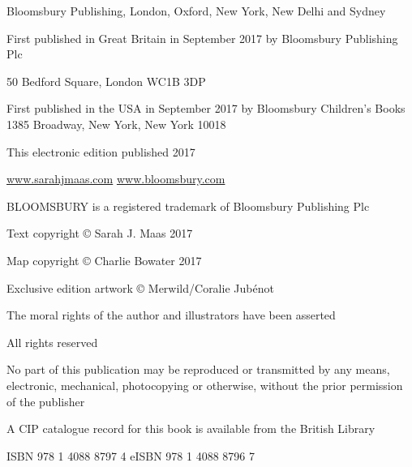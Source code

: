 
\newpage 
Bloomsbury Publishing, London, Oxford, New York, New Delhi and Sydney

First published in Great Britain in September 2017 by Bloomsbury Publishing Plc

50 Bedford Square, London WC1B 3DP

First published in the USA in September 2017 by Bloomsbury Children's Books 1385 Broadway, New York, New York 10018 

This electronic edition published 2017

\href{http://www.sarahjmaas.com/}{www.sarahjmaas.com}
\href{http://www.bloomsbury.com/}{www.bloomsbury.com}

BLOOMSBURY is a registered trademark of Bloomsbury Publishing Plc

Text copyright © Sarah J. Maas 2017

Map copyright © Charlie Bowater 2017

Exclusive edition artwork © Merwild/Coralie Jubénot

The moral rights of the author and illustrators have been asserted

All rights reserved

No part of this publication may be reproduced or transmitted by any means, electronic, mechanical, photocopying or otherwise, without the prior permission of the publisher

A CIP catalogue record for this book is available from the British Library

ISBN 978 1 4088 8797 4 eISBN 978 1 4088 8796 7
